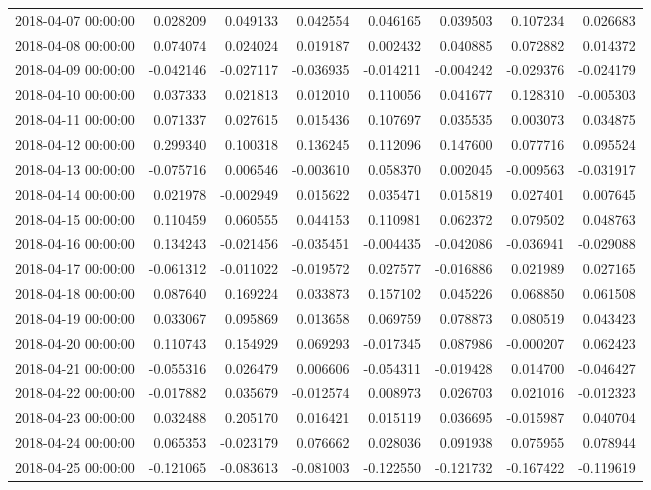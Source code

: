 \begin{tabular}{lrrrrrrr}
2018-04-07 00:00:00 & 0.028209 & 0.049133 & 0.042554 & 0.046165 & 0.039503 & 0.107234 & 0.026683 \\
2018-04-08 00:00:00 & 0.074074 & 0.024024 & 0.019187 & 0.002432 & 0.040885 & 0.072882 & 0.014372 \\
2018-04-09 00:00:00 & -0.042146 & -0.027117 & -0.036935 & -0.014211 & -0.004242 & -0.029376 & -0.024179 \\
2018-04-10 00:00:00 & 0.037333 & 0.021813 & 0.012010 & 0.110056 & 0.041677 & 0.128310 & -0.005303 \\
2018-04-11 00:00:00 & 0.071337 & 0.027615 & 0.015436 & 0.107697 & 0.035535 & 0.003073 & 0.034875 \\
2018-04-12 00:00:00 & 0.299340 & 0.100318 & 0.136245 & 0.112096 & 0.147600 & 0.077716 & 0.095524 \\
2018-04-13 00:00:00 & -0.075716 & 0.006546 & -0.003610 & 0.058370 & 0.002045 & -0.009563 & -0.031917 \\
2018-04-14 00:00:00 & 0.021978 & -0.002949 & 0.015622 & 0.035471 & 0.015819 & 0.027401 & 0.007645 \\
2018-04-15 00:00:00 & 0.110459 & 0.060555 & 0.044153 & 0.110981 & 0.062372 & 0.079502 & 0.048763 \\
2018-04-16 00:00:00 & 0.134243 & -0.021456 & -0.035451 & -0.004435 & -0.042086 & -0.036941 & -0.029088 \\
2018-04-17 00:00:00 & -0.061312 & -0.011022 & -0.019572 & 0.027577 & -0.016886 & 0.021989 & 0.027165 \\
2018-04-18 00:00:00 & 0.087640 & 0.169224 & 0.033873 & 0.157102 & 0.045226 & 0.068850 & 0.061508 \\
2018-04-19 00:00:00 & 0.033067 & 0.095869 & 0.013658 & 0.069759 & 0.078873 & 0.080519 & 0.043423 \\
2018-04-20 00:00:00 & 0.110743 & 0.154929 & 0.069293 & -0.017345 & 0.087986 & -0.000207 & 0.062423 \\
2018-04-21 00:00:00 & -0.055316 & 0.026479 & 0.006606 & -0.054311 & -0.019428 & 0.014700 & -0.046427 \\
2018-04-22 00:00:00 & -0.017882 & 0.035679 & -0.012574 & 0.008973 & 0.026703 & 0.021016 & -0.012323 \\
2018-04-23 00:00:00 & 0.032488 & 0.205170 & 0.016421 & 0.015119 & 0.036695 & -0.015987 & 0.040704 \\
2018-04-24 00:00:00 & 0.065353 & -0.023179 & 0.076662 & 0.028036 & 0.091938 & 0.075955 & 0.078944 \\
2018-04-25 00:00:00 & -0.121065 & -0.083613 & -0.081003 & -0.122550 & -0.121732 & -0.167422 & -0.119619 \\

\end{tabular}
